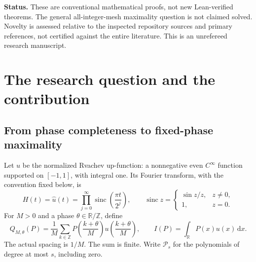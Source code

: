 \documentclass[11pt,a4paper]{article}
\numberwithin{equation}{section}
\theoremstyle{plain}
\theoremstyle{definition}
\theoremstyle{remark}
\newcommand{\R}{\mathbb R}
\newcommand{\Z}{\mathbb Z}
\newcommand{\T}{\mathbb R/\mathbb Z}
\newcommand{\dd}{\,\mathrm d}
\newcommand{\sinc}{\operatorname{sinc}}
\newcommand{\Poly}{\mathcal P}
\begin{document}
\begin{titlepage}
\begin{minipage}{0.93\textwidth}
\begin{abstract}
A three-factor Fourier estimate also shows that the first defect has
exactly two nondegenerate stationary points, and gives a quantitative
stability theorem for its zeros under $C^1$ perturbations. The results
transfer to moment-deconvolved polynomial synthesis and to refined phase
averages. The article supplies complete analytic proofs, independent exact
and numerical checks, and a proposed formalization and research program.
\end{abstract}
\end{minipage}
\vfill
\begin{minipage}{0.93\textwidth}
\small
\textbf{Status.} These are conventional mathematical proofs, not new
Lean-verified theorems. The general all-integer-mesh maximality question is
not claimed solved. Novelty is assessed relative to the inspected repository
sources and primary references, not certified against the entire literature.
This is an unrefereed research manuscript.
\end{minipage}
\end{titlepage}
\hypersetup{pageanchor=true}
\begingroup
\small\setlength{\parskip}{0pt}
\tableofcontents
\endgroup
\newpage

\section{The research question and the contribution}
\label{sec:intro}

\subsection{From phase completeness to fixed-phase maximality}

Let $u$ be the normalized Rvachev up-function: a nonnegative even
$C^\infty$ function supported on $[-1,1]$, with integral one. Its Fourier
transform, with the convention fixed below, is
\begin{equation}\label{eq:H}
 H(t)=\widehat u(t)=\prod_{j=0}^{\infty}
 \sinc\!\left(\frac{\pi t}{2^j}\right),
 \qquad \sinc z=\begin{cases}\sin z/z,&z\ne0,\\1,&z=0.\end{cases}
\end{equation}
For $M>0$ and a phase $\theta\in\T$, define
\begin{equation}\label{eq:rule}
 Q_{M,\theta}(P)=\frac1M\sum_{k\in\Z}
 P\!\left(\frac{k+\theta}{M}\right)
 u\!\left(\frac{k+\theta}{M}\right),
 \qquad I(P)=\int_\R P(x)u(x)\dd x.
\end{equation}
The actual spacing is $1/M$. The sum is finite. Write $\Poly_s$ for the
polynomials of degree at most $s$, including zero.
\end{document}
